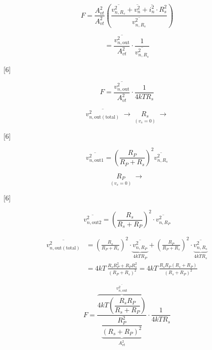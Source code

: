 \documentclass[11pt,a4paper]{article}
\begin{document}

\[ F = \frac{A_{vt}^2}{A_{vt}^2}\left(\frac{\overline{v_{n,R_s}^2}+\overline{v_n^2}+\overline{i_n^2}\cdot R_s^2}{\overline{v_{n,R_s}^2}}\right) \]

\[ = \frac{\overline{v_{n,\mathrm{out}}^2}}{A_{vt}^2}\cdot\frac{1}{\overline{v_{n,R_s}^2}} \]


\begin{ornek}
[6]
\end{ornek}

\[ F = \frac{\overline{v_{n,\mathrm{out}}^2}}{A_{vt}^2}\cdot\frac{1}{4kTR_s} \]


\[ \overline{v_{n,\mathrm{out(total)}}^2} \;\rightarrow\; \underset{(v_s=0)}{R_s} \;\longrightarrow \]

[6]

\[ \overline{v_{n,\mathrm{out}1}^2} = \left(\frac{R_P}{R_P+R_s}\right)^2 \overline{v_{n,R_s}^2} \]

\[ \underset{(v_s=0)}{R_P} \;\rightarrow \]

[6]

\[ \overline{v_{n,\mathrm{out}2}^2} = \left(\frac{R_s}{R_s+R_P}\right)^2 \cdot \overline{v_{n,R_P}^2} \]

\begin{align*}
\overline{v_{n,\mathrm{out(total)}}^2} &= \left(\frac{R_s}{R_P+R_s}\right)^2 \cdot \underbrace{\overline{v_{n,R_P}^2}}_{4kTR_P} + \left(\frac{R_P}{R_P+R_s}\right)^2 \cdot \underbrace{\overline{v_{n,R_s}^2}}_{4kTR_s} \\
&= 4kT\,\frac{R_sR_P^2 + R_PR_s^2}{(R_P+R_s)^2} = 4kT\,\frac{R_sR_P(R_s+R_P)}{(R_s+R_P)^2}
\end{align*}


\[ F = \frac{\overbrace{4kT\left(\dfrac{R_sR_P}{R_s+R_P}\right)}^{\overline{v_{n,\mathrm{out}}^2}}}{\underbrace{\dfrac{R_P^2}{(R_s+R_P)^2}}_{A_{vt}^2}} \cdot \frac{1}{4kTR_s} \]
\end{document}
